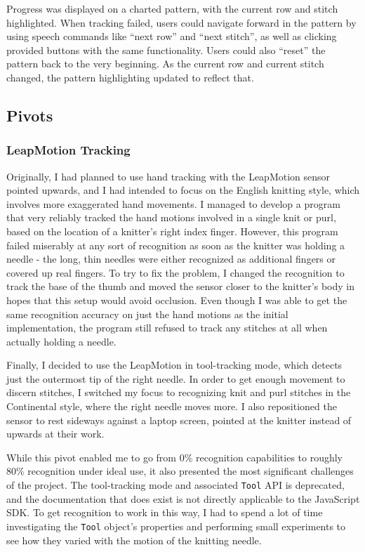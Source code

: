 \documentclass[11pt,twocolumn]{article}
\begin{document}
Progress was displayed on a charted pattern, with the current row and stitch highlighted.
When tracking failed, users could navigate forward in the pattern by using speech commands like ``next row'' and ``next stitch'', as well as clicking provided buttons with the same functionality.
Users could also ``reset'' the pattern back to the very beginning.
As the current row and current stitch changed, the pattern highlighting updated to reflect that.

\subsection{Pivots} \label{pivots}

\subsubsection{LeapMotion Tracking} \label{pivotTracking}
Originally, I had planned to use hand tracking with the LeapMotion sensor pointed upwards, and I had intended to focus on the English knitting style, which involves more exaggerated hand movements.
I managed to develop a program that very reliably tracked the hand motions involved in a single knit or purl, based on the location of a knitter's right index finger.
However, this program failed miserably at any sort of recognition as soon as the knitter was holding a needle - the long, thin needles were either recognized as additional fingers or covered up real fingers.
To try to fix the problem, I changed the recognition to track the base of the thumb and moved the sensor closer to the knitter's body in hopes that this setup would avoid occlusion.
Even though I was able to get the same recognition accuracy on just the hand motions as the initial implementation, the program still refused to track any stitches at all when actually holding a needle.

Finally, I decided to use the LeapMotion in tool-tracking mode, which detects just the outermost tip of the right needle.
In order to get enough movement to discern stitches, I switched my focus to recognizing knit and purl stitches in the Continental style, where the right needle moves more.
I also repositioned the sensor to rest sideways against a laptop screen, pointed at the knitter instead of upwards at their work.

While this pivot enabled me to go from 0\% recognition capabilities to roughly 80\% recognition under ideal use, it also presented the most significant challenges of the project.
The tool-tracking mode and associated \texttt{Tool} API is deprecated, and the documentation that does exist is not directly applicable to the JavaScript SDK.
To get recognition to work in this way, I had to spend a lot of time investigating the \texttt{Tool} object's properties and performing small experiments to see how they varied with the motion of the knitting needle.
\end{document}

